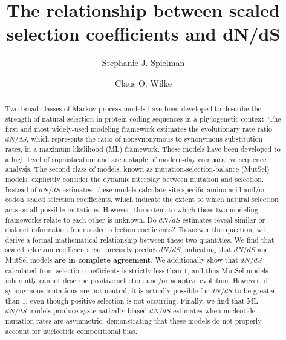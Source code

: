 \documentclass{pnastwo}
\begin{document}
	
	
\title{The relationship between scaled selection coefficients and dN/dS}
	
\author{Stephanie J. Spielman 
	\and
	Claus O. Wilke
}
	
\maketitle

\begin{article}
		
\begin{abstract} %
Two broad classes of Markov-process models have been developed to describe the strength of natural selection in protein-coding sequences in a phylogenetic context. The first and most widely-used modeling framework estimates the evolutionary rate ratio $dN/dS$, which represents the ratio of nonsynonymous to synonymous substitution rates, in a maximum likelihood (ML) framework. These models have been developed to a high level of sophistication and are a staple of modern-day comparative sequence analysis. The second class of models, known as mutation-selection-balance (MutSel) models, explicitly consider the dynamic interplay between mutation and selection. Instead of $dN/dS$ estimates, these models calculate site-specific amino-acid and/or codon scaled selection coefficients, which indicate the extent to which natural selection acts on all possible mutations. However, the extent to which these two modeling frameworks relate to each other is unknown. Do $dN/dS$ estimates reveal similar or distinct information from scaled selection coefficients? To answer this question, we derive a formal mathematical relationship between these two quantities. We find that scaled selection coefficients can  precisely predict $dN/dS$, indicating that $dN/dS$ and MutSel models \textbf{are in complete agreement}. We additionally show that $dN/dS$ calculated from selection coefficients is strictly less than 1, and thus MutSel models inherently cannot describe positive selection and/or adaptive evolution. However, if synonymous mutations are not neutral, it is actually possible for $dN/dS$ to be greater than 1, even though positive selection is not occurring. Finally, we find that ML $dN/dS$ models produce systematically biased $dN/dS$ estimates when nucleotide mutation rates are asymmetric, demonstrating that these models do not properly account for nucleotide compositional bias.
\end{abstract}
		

\end{article}
\end{document}
